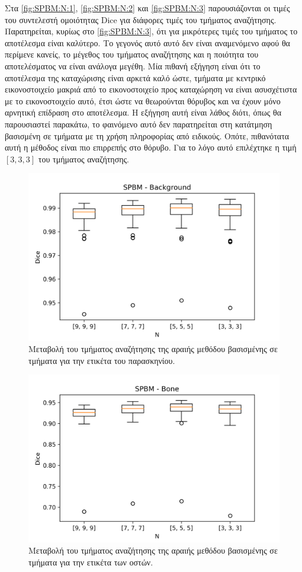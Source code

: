\documentclass[a4paper,12pt]{article}
\begin{document}
Στα \autoref{fig:SPBM:N:1}, \autoref{fig:SPBM:N:2} και \autoref{fig:SPBM:N:3}
παρουσιάζονται οι τιμές του συντελεστή ομοιότητας Dice για διάφορες τιμές του
τμήματος αναζήτησης. Παρατηρείται, κυρίως στο \autoref{fig:SPBM:N:3}, ότι για
μικρότερες τιμές του τμήματος το αποτέλεσμα είναι καλύτερο. Το γεγονός αυτό αυτό
δεν είναι αναμενόμενο αφού θα περίμενε κανείς, το μέγεθος του τμήματος
αναζήτησης και η ποιότητα του αποτελέσματος να είναι ανάλογα μεγέθη. Μία πιθανή
εξήγηση είναι ότι το αποτέλεσμα της καταχώρισης είναι αρκετά καλό ώστε, τμήματα
με κεντρικό εικονοστοιχείο μακριά από το εικονοστοιχείο προς καταχώρηση να είναι
ασυσχέτιστα με το εικονοστοιχείο αυτό, έτσι ώστε να θεωρούνται θόρυβος
και να έχουν μόνο αρνητική επίδραση στο αποτέλεσμα. Η εξήγηση αυτή είναι λάθος
διότι, όπως θα παρουσιαστεί παρακάτω, το φαινόμενο αυτό δεν παρατηρείται στη
κατάτμηση βασισμένη σε τμήματα με τη χρήση πληροφορίας από ειδικούς. Οπότε,
πιθανότατα αυτή η μέθοδος είναι πιο επιρρεπής στο θόρυβο. Για το λόγο αυτό
επιλέχτηκε η τιμή $[3,3,3]$ του τμήματος αναζήτησης.


\begin{figure}[H]
    \centering
    \includegraphics[width=0.85\linewidth]{SPBM_N_Background_plot.png}
    \caption{Μεταβολή του τμήματος αναζήτησης της αραιής μεθόδου βασισμένης σε
             τμήματα για την ετικέτα του παρασκηνίου.}
    \label{fig:SPBM:N:1}
\end{figure}

\begin{figure}[H]
    \centering
    \includegraphics[width=0.85\linewidth]{SPBM_N_Bone_plot.png}
    \caption{Μεταβολή του τμήματος αναζήτησης της αραιής μεθόδου βασισμένης σε
             τμήματα για την ετικέτα των οστών.}
    \label{fig:SPBM:N:2}
\end{figure}
\end{document}
